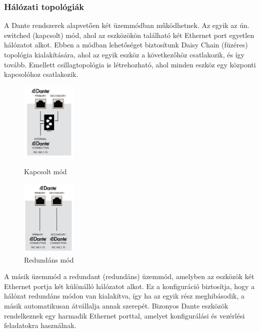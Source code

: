 \subsubsection{Hálózati topológiák}
A Dante rendszerek alapvetően két üzemmódban működhetnek. Az egyik az ún. 
switched (kapcsolt) mód, ahol az eszközökön található két Ethernet port egyetlen 
hálózatot alkot. Ebben a módban lehetőséget biztosítunk Daisy Chain (füzéres) 
topológia kialakítására, ahol az egyik eszköz a következőhöz csatlakozik, és így tovább. 
Emellett csillagtopológia is létrehozható, ahol minden eszköz egy központi kapcsolóhoz 
csatlakozik.
\begin{figure}[H]
	\begin{minipage}{0.5\textwidth}
		\centering
		\includegraphics[width=100px, keepaspectratio]{figures/dante-switched-mode.jpg}
		\caption{Kapcsolt mód}
		\label{fig:dante_switched}
	\end{minipage}%
	\begin{minipage}{0.5\textwidth}
		\centering
		\includegraphics[width=100px, keepaspectratio]{figures/dante-redundant-mode.jpg}
		\caption{Redundáns mód}
		\label{fig:dante_redundant}
	\end{minipage}
\end{figure}
A másik üzemmód a redundant (redundáns) üzemmód, amelyben az eszközök két 
Ethernet portja két különálló hálózatot alkot. Ez a konfiguráció biztosítja, hogy 
a hálózat redundáns módon van kialakítva, így ha az egyik rész meghibásodik, 
a másik automatikusan átvállalja annak szerepét. 
Bizonyos Dante eszközök rendelkeznek egy harmadik Ethernet porttal, 
amelyet konfigurálási és vezérlési feladatokra használnak.
